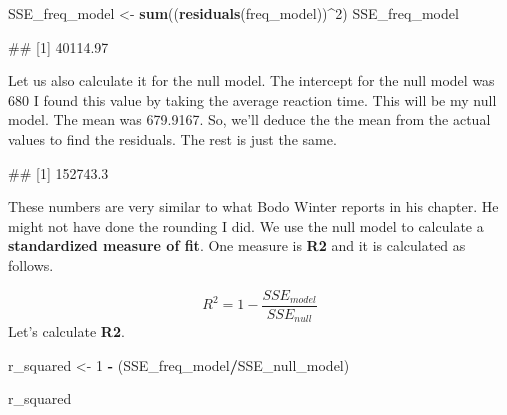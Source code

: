 \documentclass[
]{book}
\newenvironment{Shaded}{\begin{snugshade}}{\end{snugshade}}
\newcommand{\DecValTok}[1]{\textcolor[rgb]{0.00,0.00,0.81}{#1}}
\newcommand{\FunctionTok}[1]{\textcolor[rgb]{0.13,0.29,0.53}{\textbf{#1}}}
\newcommand{\NormalTok}[1]{#1}
\newcommand{\OtherTok}[1]{\textcolor[rgb]{0.56,0.35,0.01}{#1}}
\newcommand{\SpecialCharTok}[1]{\textcolor[rgb]{0.81,0.36,0.00}{\textbf{#1}}}
\begin{document}
\begin{Shaded}
\begin{Highlighting}[]
\NormalTok{SSE\_freq\_model }\OtherTok{\textless{}{-}} \FunctionTok{sum}\NormalTok{((}\FunctionTok{residuals}\NormalTok{(freq\_model))}\SpecialCharTok{\^{}}\DecValTok{2}\NormalTok{)}
\NormalTok{SSE\_freq\_model}
\end{Highlighting}
\end{Shaded}

\begin{Shaded}
\begin{Highlighting}[]
\NormalTok{\#\# [1] 40114.97}
\end{Highlighting}
\end{Shaded}

Let us also calculate it for the null model. The intercept for the null model was 680 I found this value by taking the average reaction time. This will be my null model. The mean was 679.9167. So, we'll deduce the the mean from the actual values to find the residuals. The rest is just the same.

\begin{Shaded}
\end{Shaded}

\begin{Shaded}
\begin{Highlighting}[]
\NormalTok{\#\# [1] 152743.3}
\end{Highlighting}
\end{Shaded}

These numbers are very similar to what Bodo Winter reports in his chapter. He might not have done the rounding I did. We use the null model to calculate a \textbf{standardized measure of fit}. One measure is \textbf{R2} and it is calculated as follows.

\[R^2 = 1 - \frac{SSE_{model}}{SSE_{null}} \]
Let's calculate \textbf{R2}.

\begin{Shaded}
\begin{Highlighting}[]
\NormalTok{r\_squared }\OtherTok{\textless{}{-}} \DecValTok{1} \SpecialCharTok{{-}}\NormalTok{ (SSE\_freq\_model}\SpecialCharTok{/}\NormalTok{SSE\_null\_model)}

\NormalTok{r\_squared}
\end{Highlighting}
\end{Shaded}
\end{document}

